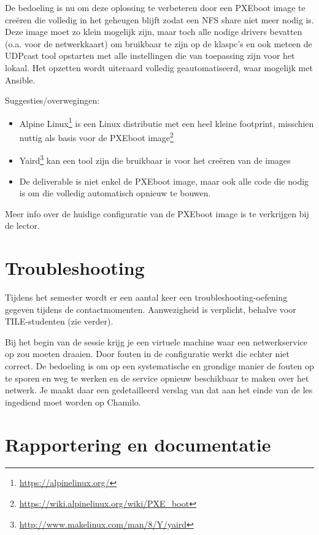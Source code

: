 De bedoeling is nu om deze oplossing te verbeteren door een PXEboot image te creëren die volledig in het geheugen blijft zodat een NFS share niet meer nodig is. Deze image moet zo klein mogelijk zijn, maar toch alle nodige drivers bevatten (o.a. voor de netwerkkaart) om bruikbaar te zijn op de klaspc's en ook meteen de UDPcast tool opstarten met alle instellingen die van toepassing zijn voor het lokaal. Het opzetten wordt uiteraard volledig geautomatiseerd, waar mogelijk met Ansible.

Suggesties/overwegingen:

\begin{itemize}
\item Alpine Linux\footnote{\url{https://alpinelinux.org/}} is een Linux distributie met een heel kleine footprint, misschien nuttig als basis voor de PXEboot image\footnote{\url{https://wiki.alpinelinux.org/wiki/PXE_boot}}
\item Yaird\footnote{\url{http://www.makelinux.com/man/8/Y/yaird}} kan een tool zijn die bruikbaar is voor het creëren van de images
\item De deliverable is niet enkel de PXEboot image, maar ook alle code die nodig is om die volledig automatisch opnieuw te bouwen.
\end{itemize}

Meer info over de huidige configuratie van de PXEboot image is te verkrijgen bij de lector.

\section{Troubleshooting}
\label{troubleshooting}

Tijdens het semester wordt er een aantal keer een troubleshooting-oefening gegeven tijdens de contactmomenten. Aanwezigheid is verplicht, behalve voor TILE-studenten (zie verder).

Bij het begin van de sessie krijg je een virtuele machine waar een netwerkservice op zou moeten draaien. Door fouten in de configuratie werkt die echter niet correct. De bedoeling is om op een systematische en grondige manier de fouten op te sporen en weg te werken en de service opnieuw beschikbaar te maken over het netwerk. Je maakt daar een gedetailleerd verslag van dat aan het einde van de les ingediend moet worden op Chamilo.

\section{Rapportering en documentatie}
\label{rapportering-en-documentatie}

